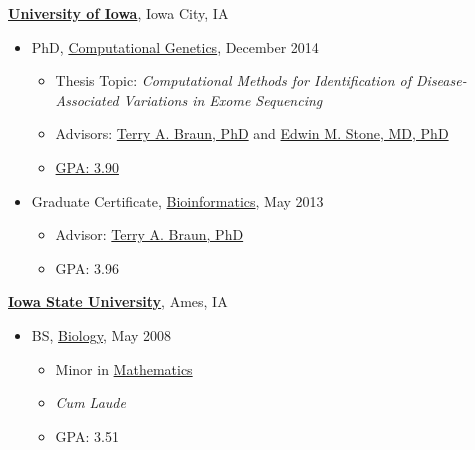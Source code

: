 \documentclass[11pt]{article}
\newenvironment{innerlist}[1][\enskip\textbullet]%
        {\begin{itemize}[#1,leftmargin=*,parsep=0pt,itemsep=0pt,topsep=0pt,partopsep=0pt]}
        {\end{itemize}}
\newcommand{\halfblankline}{\quad\vspace{-0.5\baselineskip}\pagebreak[3]}
\begin{document}
\href{http://www.uiowa.edu}{\textbf{University of Iowa}},
Iowa City, IA
\begin{innerlist}

\item[] PhD,
        \href{http://genetics.grad.uiowa.edu/about-our-program/computational-genetics}
             {Computational Genetics},
             December 2014
        \begin{innerlist}
        \item Thesis Topic: \emph{Computational Methods for Identification of Disease-Associated Variations in Exome Sequencing}
        \item Advisors:
              \href{http://www.engineering.uiowa.edu/bme/faculty-staff/terry-braun}
                   {Terry A. Braun, PhD} and
              \href{http://www.medicine.uiowa.edu/dept_primary_apr.aspx?appointment=Ophthalmology%20and%20Visual%20Sciences&id=stonee}
                   {Edwin M. Stone, MD, PhD}
        \item \href{http://pdb-d.eng.uiowa.edu/~wagnerah/transcript.pdf}
		{GPA: 3.90}
        \end{innerlist}

\item[] Graduate Certificate,
        \href{http://informatics.grad.uiowa.edu/bioinformatics}
             {Bioinformatics},
             May 2013
        \begin{innerlist}
        \item Advisor:
              \href{http://www.engineering.uiowa.edu/bme/faculty-staff/terry-braun}
                   {Terry A. Braun, PhD}
        \item GPA: 3.96
        \end{innerlist}
\end{innerlist}

\halfblankline

\href{http://www.iastate.edu}{\textbf{Iowa State University}},
Ames, IA
\begin{innerlist}
\item[] BS,
        \href{http://discover.las.iastate.edu/academics/biology/}
             {Biology}, May 2008
        \begin{innerlist}
        \item Minor in \href{http://www.math.iastate.edu/Undergrad/Programs.html}
        	{Mathematics}
        \item \emph{Cum Laude}
        \item GPA: 3.51
        \end{innerlist}
\end{innerlist}
\end{document}
